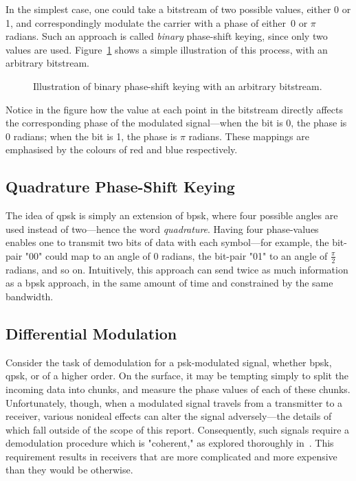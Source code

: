 \documentclass[class=report,11pt,crop=false]{standalone}
\begin{document}
In the simplest case, one could take a bitstream of two possible values, either 0 or 1, and correspondingly modulate the carrier with a phase of either~\(0\) or \(\pi\) radians. Such an approach is called \emph{binary} phase-shift keying, since only two values are used. Figure~\ref{fig:binary-psk} shows a simple illustration of this process, with an arbitrary bitstream.
\begin{figure}[htbp]
    \centering
    \captionsetup{type=figure}
    \def\svgwidth{1\linewidth}
    {\scriptsize
        }
    \caption{Illustration of binary phase-shift keying with an arbitrary bitstream.}
    \label{fig:binary-psk}
\end{figure}
Notice in the figure how the value at each point in the bitstream directly affects the corresponding phase of the modulated signal---when the bit is 0, the phase is \(0\) radians; when the bit is 1, the phase is \(\pi\) radians. These mappings are emphasised by the colours of red and blue respectively.

\subsection{Quadrature Phase-Shift Keying}
The idea of \gls{qpsk} is simply an extension of \gls{bpsk}, where four possible angles are used instead of two---hence the word \emph{quadrature}. Having four phase-values enables one to transmit two bits of data with each symbol---for example, the bit-pair "00" could map to an angle of 0 radians, the bit-pair "01" to an angle of \(\frac{\pi}{2}\) radians, and so on. Intuitively, this approach can send twice as much information as a \gls{bpsk} approach, in the same amount of time and constrained by the same bandwidth.

\subsection{Differential Modulation}
Consider the task of demodulation for a \gls{psk}-modulated signal, whether \gls{bpsk}, \gls{qpsk}, or of a higher order. On the surface, it may be tempting simply to split the incoming data into chunks, and measure the phase values of each of these chunks. Unfortunately, though, when a modulated signal travels from a transmitter to a receiver, various nonideal effects can alter the signal adversely---the details of which fall outside of the scope of this report. Consequently, such signals require a demodulation procedure which is "coherent," as explored thoroughly in~\cite{Grami2016}. This requirement results in receivers that are more complicated and more expensive than they would be otherwise.
\end{document}
